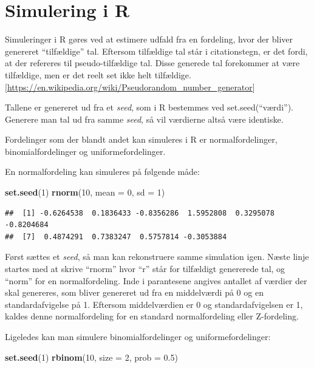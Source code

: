 \documentclass[]{book}
\newenvironment{Shaded}{\begin{snugshade}}{\end{snugshade}}
\newcommand{\DataTypeTok}[1]{\textcolor[rgb]{0.13,0.29,0.53}{#1}}
\newcommand{\DecValTok}[1]{\textcolor[rgb]{0.00,0.00,0.81}{#1}}
\newcommand{\FloatTok}[1]{\textcolor[rgb]{0.00,0.00,0.81}{#1}}
\newcommand{\KeywordTok}[1]{\textcolor[rgb]{0.13,0.29,0.53}{\textbf{#1}}}
\newcommand{\NormalTok}[1]{#1}
\theoremstyle{definition}
\theoremstyle{definition}
\theoremstyle{definition}
\theoremstyle{remark}
\begin{document}
\hypertarget{simulering-i-r}{%
\section{Simulering i R}\label{simulering-i-r}}

Simuleringer i R gøres ved at estimere udfald fra en fordeling, hvor der bliver genereret ``tilfældige'' tal. Eftersom tilfældige tal står i citationstegn, er det fordi, at der refereres til pseudo-tilfældige tal.
Disse generede tal forekommer at være tilfældige, men er det reelt set ikke helt tilfældige. {[}\url{https://en.wikipedia.org/wiki/Pseudorandom_number_generator}{]}

Tallene er genereret ud fra et \emph{seed}, som i R bestemmes ved set.seed(``værdi''). Generere man tal ud fra samme \emph{seed}, så vil værdierne altså være identiske.

Fordelinger som der blandt andet kan simuleres i R er normalfordelinger, binomialfordelinger og uniformefordelinger.

En normalfordeling kan simuleres på følgende måde:

\begin{Shaded}
\begin{Highlighting}[]
\KeywordTok{set.seed}\NormalTok{(}\DecValTok{1}\NormalTok{)}
\KeywordTok{rnorm}\NormalTok{(}\DecValTok{10}\NormalTok{, }\DataTypeTok{mean =} \DecValTok{0}\NormalTok{, }\DataTypeTok{sd =} \DecValTok{1}\NormalTok{)}
\end{Highlighting}
\end{Shaded}

\begin{verbatim}
##  [1] -0.6264538  0.1836433 -0.8356286  1.5952808  0.3295078 -0.8204684
##  [7]  0.4874291  0.7383247  0.5757814 -0.3053884
\end{verbatim}

Først sættes et \emph{seed}, så man kan rekonstruere samme simulation igen. Næste linje startes med at skrive ``rnorm'' hvor ``r'' står for tilfældigt genererede tal, og ``norm'' for en normalfordeling. Inde i parantesene angives antallet af værdier der skal genereres, som bliver genereret ud fra en middelværdi på 0 og en standardafvigelse på 1. Eftersom middelværdien er 0 og standardafvigelsen er 1, kaldes denne normalfordeling for en standard normalfordeling eller Z-fordeling.

Ligeledes kan man simulere binomialfordelinger og uniformefordelinger:

\begin{Shaded}
\begin{Highlighting}[]
\KeywordTok{set.seed}\NormalTok{(}\DecValTok{1}\NormalTok{)}
\KeywordTok{rbinom}\NormalTok{(}\DecValTok{10}\NormalTok{, }\DataTypeTok{size =} \DecValTok{2}\NormalTok{, }\DataTypeTok{prob =} \FloatTok{0.5}\NormalTok{)}
\end{Highlighting}
\end{Shaded}
\end{document}
